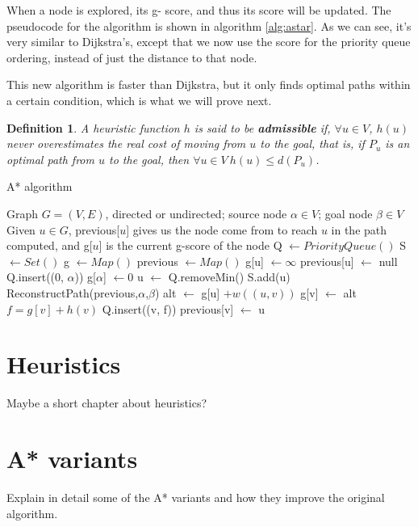 \documentclass[12pt]{report}
\newtheorem{definition}[theorem]{Definition}
\begin{document}
When a node is explored, its g- score, and thus its score will be updated. The pseudocode for the algorithm is shown in algorithm \ref{alg:astar}. As we can see, it's very similar to Dijkstra's, except that we now use the score for the priority queue ordering, instead of just the distance to that node.

This new algorithm is faster than Dijkstra, but it only finds optimal paths within a certain condition, which is what we will prove next.

\begin{definition}
A heuristic function $h$ is said to be \textbf{admissible} if, $\forall u \in V$, $h(u)$ never overestimates the real cost of moving from $u$ to the goal, that is, if $P_u$ is an optimal path from $u$ to the goal, then $\forall u \in V \ h(u) \le d(P_u)$.
\end{definition}



\begin{algorithm}
\caption{A* algorithm}
\label{alg:astar}
\begin{algorithmic}[1]
\Require Graph $G = (V, E)$, directed or undirected; source node $\alpha \in V$; goal node $\beta \in V$
\Ensure Given $u \in G$, previous[$u$] gives us the node come from to reach $u$ in the path computed, and g[$u$] is the current g-score of the node
\State Q $\gets PriorityQueue()$
\State S $\gets Set()$
\State g $\gets Map()$
\State previous $\gets Map()$
	\State g[u] $\gets \infty$
	\State previous[u] $\gets$ null
\EndFor
\State Q.insert((0, $\alpha$))
\State g[$\alpha$] $\gets 0$
	\State u $\gets$ Q.removeMin()
	\State S.add(u)
	 
		\State \Return ReconstructPath(previous,$\alpha$,$\beta$)
	\EndIf
			\Continue {}
		\EndIf
		\State alt $\gets$ g[u] $+ w((u, v))$
			\State g[v] $\gets$ alt 
			\State $f = g[v] + h(v)$
			\State Q.insert((v, f))
			\State previous[v] $\gets$ u
		\EndIf
	\EndFor
\EndWhile
\EndProcedure
\end{algorithmic}
\end{algorithm}


\chapter{Heuristics}
Maybe a short chapter about heuristics?

\chapter{A* variants}
Explain in detail some of the A* variants and how they improve the original algorithm.
\end{document}
